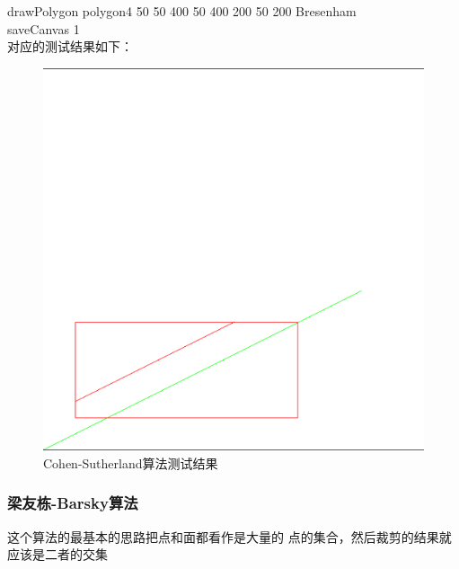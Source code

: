 \documentclass[a4paper,UTF8]{article}
\theoremstyle{definition}
\begin{document}
drawPolygon polygon4 50 50 400 50 400 200 50 200 Bresenham\\

saveCanvas 1\\

对应的测试结果如下：\\

\begin{figure}[h]
	\centering
	\includegraphics[scale=0.4]{figure/clip1.png}
	\caption{Cohen-Sutherland算法测试结果}
	\label{fig:Cohen-Sutherland算法剪切}
\end{figure}

\subsubsection{梁友栋-Barsky算法}
这个算法的最基本的思路把点和面都看作是大量的
点的集合，然后裁剪的结果就应该是二者的交集
\end{document}
